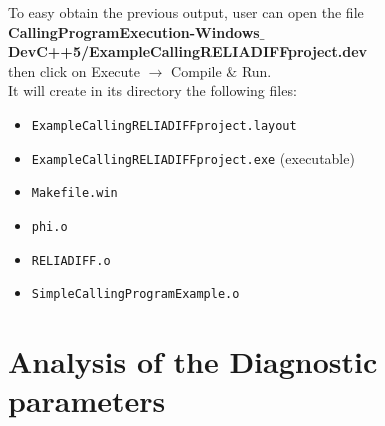 \documentclass[10pt]{article}
\begin{document}
To easy obtain the previous output, user can open the file\\
{\bf\small CallingProgramExecution-Windows$\_$DevC++5/ExampleCallingRELIADIFFproject.dev}\\
then click on Execute $\to$ Compile $\&$ Run.\\
It will create in its directory the following files:

\begin{itemize}
\item {\tt ExampleCallingRELIADIFFproject.layout}
\item {\tt ExampleCallingRELIADIFFproject.exe} (executable)
\item {\tt Makefile.win}
\item {\tt phi.o}
\item {\tt RELIADIFF.o}
\item {\tt SimpleCallingProgramExample.o}
\end{itemize}

\section{Analysis of  the Diagnostic parameters}
\end{document}
